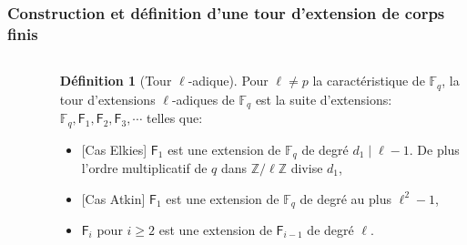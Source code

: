 \documentclass[10pt,a4paper]{beamer}
\theoremstyle{plain}
\theoremstyle{definition}
\theoremstyle{definition}
\theoremstyle{definition}
\theoremstyle{definition}
\newtheorem{defi}[thm]{Définition}
\theoremstyle{remark}
\theoremstyle{remark}
\begin{document}
\begin{frame}
\frametitle{Construction et définition d'une tour d'extension de corps finis}
\begin{columns}
\begin{column}{2cm}
\begin{center}
\begin{figure}
\end{figure}
\end{center}
\end{column}
\begin{column}{8cm}

\begin{defi}[Tour \textit{$\ell$}-adique]
Pour $\ell \neq p$ la caractéristique de $\mathbb{F}_q$, la tour d'extensions $\ell$-adiques de $\mathbb{F}_q$ est la suite d'extensions: $\mathbb{F}_q, \mathsf{F}_{1}, \mathsf{F}_{2}, \mathsf{F}_{3}, \cdots$ telles que:
\begin{itemize}
\item{} [Cas Elkies] $\mathsf{F}_{1}$ est une extension de $\mathbb{F}_q$ de degré $d_1 \mid \ell-1$. De plus l'ordre multiplicatif de $q$ dans $\mathbb{Z}/\ell \mathbb{Z}$ divise $d_1$,
\item{} [Cas Atkin] $\mathsf{F}_{1}$ est une extension de $\mathbb{F}_q$ de degré au plus $ \ell^2-1$,
\item $\mathsf{F}_{i}$ pour $i \geqslant 2$ est une extension de $\mathsf{F}_{i-1}$ de degré $\ell$.
\end{itemize}

\end{defi}
\end{column}
\end{columns}
\end{frame}

\end{document}
